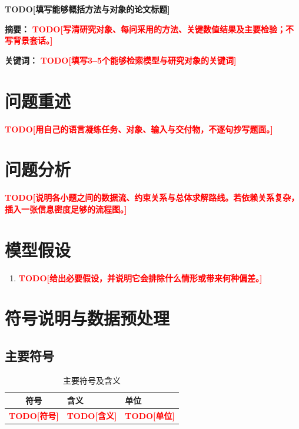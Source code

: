 \documentclass[UTF8,12pt,a4paper]{ctexart}
\newcommand{\TODO}[1]{\textcolor{red}{\textbf{TODO[#1]}}}
\newcommand{\papertitle}{TODO[填写能够概括方法与对象的论文标题]}
\begin{document}
\begin{center}
  {\bfseries \papertitle}
\end{center}

\vspace{1.2em}
\noindent\textbf{摘要：}
\TODO{写清研究对象、每问采用的方法、关键数值结果及主要检验；不写背景套话。}

\vspace{0.8em}
\noindent\textbf{关键词：}
\TODO{填写3--5个能够检索模型与研究对象的关键词}

\clearpage
\setcounter{page}{2}

\section{问题重述}

\TODO{用自己的语言凝练任务、对象、输入与交付物，不逐句抄写题面。}

\section{问题分析}

\TODO{说明各小题之间的数据流、约束关系与总体求解路线。若依赖关系复杂，插入一张信息密度足够的流程图。}

\section{模型假设}

\begin{enumerate}
  \item \TODO{给出必要假设，并说明它会排除什么情形或带来何种偏差。}
\end{enumerate}

\section{符号说明与数据预处理}

\subsection{主要符号}

\begin{table}[H]
  \centering
  \caption{主要符号及含义}
  \begin{tabular}{cll}
    \toprule
    符号 & 含义 & 单位 \\
    \midrule
    \TODO{符号} & \TODO{含义} & \TODO{单位} \\
    \bottomrule
  \end{tabular}
\end{table}
\end{document}
